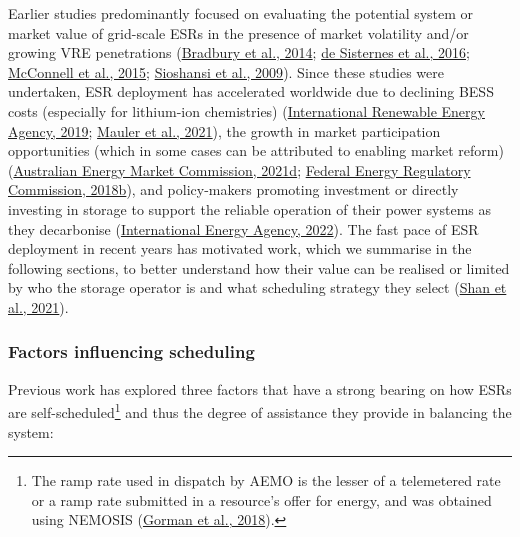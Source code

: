 \documentclass[12pt,a4paper,]{report}
\begin{document}
Earlier studies predominantly focused on evaluating the potential system
or market value of grid-scale ESRs in the presence of market volatility
and/or growing VRE penetrations
(\protect\hyperlink{ref-bradburyEconomicViabilityEnergy2014}{Bradbury et
al., 2014}; \protect\hyperlink{ref-desisternesValueEnergyStorage2016}{de
Sisternes et al., 2016};
\protect\hyperlink{ref-mcconnellEstimatingValueElectricity2015}{McConnell
et al., 2015};
\protect\hyperlink{ref-sioshansiEstimatingValueElectricity2009}{Sioshansi
et al., 2009}). Since these studies were undertaken, ESR deployment has
accelerated worldwide due to declining BESS costs (especially for
lithium-ion chemistries)
(\protect\hyperlink{ref-internationalrenewableenergyagencyUtilityscaleBatteriesInnovation2019}{International
Renewable Energy Agency, 2019};
\protect\hyperlink{ref-maulerBatteryCostForecasting2021}{Mauler et al.,
2021}), the growth in market participation opportunities (which in some
cases can be attributed to enabling market reform)
(\protect\hyperlink{ref-australianenergymarketcommissionIntegratingEnergyStorage2021}{Australian
Energy Market Commission, 2021d};
\protect\hyperlink{ref-federalenergyregulatorycommissionOrderNo8412018}{Federal
Energy Regulatory Commission, 2018b}), and policy-makers promoting
investment or directly investing in storage to support the reliable
operation of their power systems as they decarbonise
(\protect\hyperlink{ref-internationalenergyagencyGridScaleStorage2022}{International
Energy Agency, 2022}). The fast pace of ESR deployment in recent years
has motivated work, which we summarise in the following sections, to
better understand how their value can be realised or limited by who the
storage operator is and what scheduling strategy they select
(\protect\hyperlink{ref-shanDeleteriousEffectsStrategic2021}{Shan et
al., 2021}).

\hypertarget{sec:info-context-esr-operation}{%
\subsubsection{Factors influencing
scheduling}\label{sec:info-context-esr-operation}}

Previous work has explored three factors that have a strong bearing on
how ESRs are self-scheduled\footnote{The ramp rate used in dispatch by
  AEMO is the lesser of a telemetered rate or a ramp rate submitted in a
  resource's offer for energy, and was obtained using NEMOSIS
  (\protect\hyperlink{ref-gormanNEMOSISNEMOpen2018}{Gorman et al.,
  2018}).} and thus the degree of assistance they provide in balancing
the system:
\end{document}

